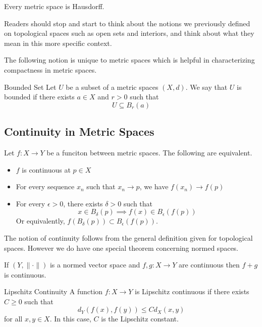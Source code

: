 \documentclass[a4paper]{article}
\begin{document}
\begin{prp}{}{} Every metric space is Hausdorff. 
\end{prp}

Readers should stop and start to think about the notions we previously defined on topological spaces such as open sets and interiors, and think about what they mean in this more specific context. 

The following notion is unique to metric spaces which is helpful in characterizing compactness in metric spaces. 

\begin{defn}{Bounded Set}{} Let $U$ be a subset of a metric spaces $(X,d)$. We say that $U$ is bounded if there exists $a\in X$ and $r>0$ such that $$U\subseteq B_r(a)$$
\end{defn}

\subsection{Continuity in Metric Spaces}
\begin{prp}{}{} Let $f:X\to Y$ be a funciton between metric spaces. The following are equivalent. 
\begin{itemize}
\item $f$ is continuous at $p\in X$
\item For every sequence $x_n$ such that $x_n\to p$, we have $f(x_n)\to f(p)$
\item For every $\epsilon>0$, there exists $\delta>0$ such that $$x\in B_{\delta}(p)\implies f(x)\in B_{\epsilon}(f(p))$$ Or equivalently, $f(B_{\delta}(p))\subset B_{\epsilon}(f(p))$. 
\end{itemize}
\end{prp}

The notion of continuity follows from the general definition given for topological spaces. However we do have one special theorem concerning normed spaces. 

\begin{prp}{}{} If $(Y,\|\cdot\|)$ is a normed vector space and $f,g:X\to Y$ are continuous then $f+g$ is continuous. 
\end{prp}

\begin{defn}{Lipschitz Continuity}{} A function $f:X\to Y$ is Lipschitz continuous if there exists $C\geq 0$ such that $$d_Y(f(x),f(y))\leq Cd_X(x,y)$$ for all $x,y\in X$. In this case, $C$ is the Lipschitz constant. 
\end{defn}
\end{document}
